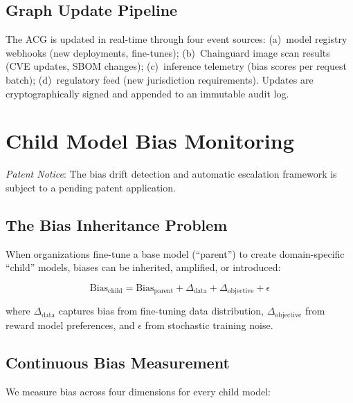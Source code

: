 \documentclass[conference,10pt]{IEEEtran}
\begin{document}
\subsection{Graph Update Pipeline}

The ACG is updated in real-time through four event sources: (a)~model registry webhooks (new deployments, fine-tunes); (b)~Chainguard image scan results (CVE updates, SBOM changes); (c)~inference telemetry (bias scores per request batch); (d)~regulatory feed (new jurisdiction requirements). Updates are cryptographically signed and appended to an immutable audit log.

\section{Child Model Bias Monitoring}
\label{sec:bias}

\emph{Patent Notice}: The bias drift detection and automatic escalation framework is subject to a pending patent application.

\subsection{The Bias Inheritance Problem}

When organizations fine-tune a base model (``parent'') to create domain-specific ``child'' models, biases can be inherited, amplified, or introduced:

\begin{equation}
\text{Bias}_{\text{child}} = \text{Bias}_{\text{parent}} + \Delta_{\text{data}} + \Delta_{\text{objective}} + \epsilon
\end{equation}

where $\Delta_{\text{data}}$ captures bias from fine-tuning data distribution, $\Delta_{\text{objective}}$ from reward model preferences, and $\epsilon$ from stochastic training noise.

\subsection{Continuous Bias Measurement}

We measure bias across four dimensions for every child model:
\end{document}
